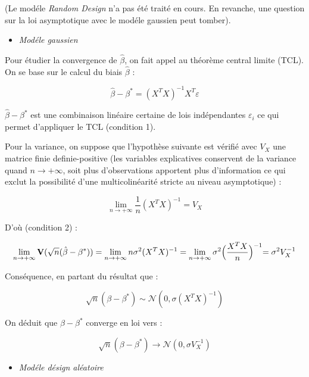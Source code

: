 \bigskip

(Le mod\'ele \textit{Random Design} n'a pas \'et\'e trait\'e en cours. En revanche, une question sur la loi asymptotique avec le mod\'ele gaussien peut tomber).

\bigskip

\begin{itemize}
	\item \textit{Mod\'ele gaussien}
\end{itemize}

Pour \'etudier la convergence de $\hat \beta$, on fait appel au th\'eor\`eme central limite (TCL). On se base sur le calcul du biais $\hat \beta$ :

$$ \hat \beta - \beta^{*} = (X^T X)^{-1} X^T \varepsilon $$

$\hat \beta - \beta^{*}$ est une combinaison lin\'eaire certaine de lois ind\'ependantes $\varepsilon_i$ ce qui permet d'appliquer le TCL (condition 1).

\bigskip

Pour la variance, on suppose que l'hypoth\`ese suivante est v\'erifi\'e avec $V_X$ une matrice finie definie-positive (les variables explicatives conservent de la variance quand $n \rightarrow +\infty$, soit plus d'observations apportent plus d'information ce qui exclut la possibilit\'e d'une multicolin\'earit\'e stricte au niveau asymptotique) :

$$ \lim_{n\rightarrow +\infty} \frac{1}{n}(X^T X)^{-1} = V_X $$

D'où (condition 2) :

$$ \lim_{n\rightarrow +\infty} \mathbf{V}(\sqrt{n} (\hat \beta - \beta^{*})) = \lim_{n\rightarrow +\infty} n \sigma^2 (X^T X)^{-1} = \lim_{n\rightarrow +\infty} \sigma^2 \Bigl(\frac{X^T X}{n}\Bigl)^{-1} = \sigma^2 V_X^{-1} $$

\bigskip

Cons\'equence, en partant du r\'esultat que :

$$ \sqrt{n} (\beta - \beta^{*}) \sim \mathcal{N}(0, \sigma (X^T X)^{-1} ) $$

\bigskip

On d\'eduit que $\beta - \beta^{*}$ converge en loi vers :

$$ \sqrt{n} (\beta - \beta^{*}) \rightarrow  \mathcal{N}(0, \sigma V_X^{-1} )$$

\bigskip

\begin{itemize}
	\item \textit{Mod\'ele d\'esign al\'eatoire}
\end{itemize}

